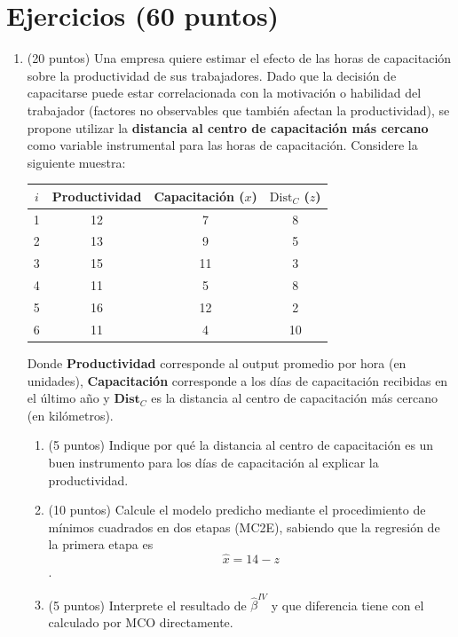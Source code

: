 \documentclass[10pt,a4paper]{article}
\begin{document}
\section{Ejercicios (60 puntos)}

\begin{enumerate}
    

\item (20 puntos) Una empresa quiere estimar el efecto de las horas de capacitación sobre la productividad de sus trabajadores. Dado que la decisión de capacitarse puede estar correlacionada con la motivación o habilidad del trabajador (factores no observables que también afectan la productividad), se propone utilizar la \textbf{distancia al centro de capacitación más cercano} como variable instrumental para las horas de capacitación. Considere la siguiente muestra:

\begin{center}
\begin{tabular}{|c|c|c|c|}
\hline
$i$ & Productividad & Capacitación ($x$)& $\text{Dist}_C$ ($z$) \\
\hline
1 & 12 & 7 & 8 \\
2 & 13 & 9 & 5 \\
3 & 15 & 11 & 3 \\
4 & 11 & 5 & 8 \\
5 & 16 & 12 & 2 \\
6 & 11 & 4 & 10 \\
\hline
\end{tabular}
\end{center}

\noindent Donde \textbf{Productividad} corresponde al output promedio por hora (en unidades), \textbf{Capacitación} corresponde a los días de capacitación recibidas en el último año y $\mathbf{Dist}_C$ es la distancia al centro de capacitación más cercano (en kilómetros).

\begin{enumerate}
    \item (5 puntos) Indique por qué la distancia al centro de capacitación es un buen instrumento para los días de capacitación al explicar la productividad.
    \item (10 puntos) Calcule el modelo predicho  mediante el procedimiento de {mínimos cuadrados en dos etapas (MC2E)}, sabiendo que la regresión de la primera etapa es $$\hat{x} = 14 - z$$.
    \item (5 puntos) Interprete el resultado de $\hat\beta^{IV}$ y que diferencia tiene con el calculado por MCO directamente.
\end{enumerate}


\end{enumerate}
\end{document}
